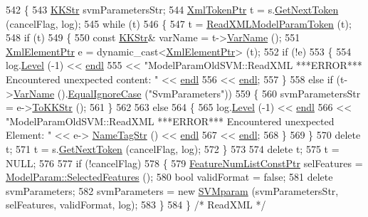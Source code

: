 \begin{DoxyCode}
542 \{
543   \hyperlink{class_k_k_b_1_1_k_k_str}{KKStr}  svmParametersStr;
544   \hyperlink{class_k_k_b_1_1_xml_token}{XmlTokenPtr}  t = s.\hyperlink{class_k_k_b_1_1_xml_stream_a87cc738b05c666cf5d5c25beaab477b4}{GetNextToken} (cancelFlag, log);
545   \textcolor{keywordflow}{while}  (t)
546   \{
547     t = \hyperlink{class_k_k_m_l_l_1_1_model_param_a6d51128c4b26cb4c432091dc2e21415d}{ReadXMLModelParamToken} (t);
548     \textcolor{keywordflow}{if}  (t)
549     \{
550       \textcolor{keyword}{const} \hyperlink{class_k_k_b_1_1_k_k_str}{KKStr}& varName = t->\hyperlink{class_k_k_b_1_1_xml_token_a28b39cfdfa2ed63048a812b1cb52263c}{VarName} ();
551       \hyperlink{class_k_k_b_1_1_xml_element}{XmlElementPtr} e = \textcolor{keyword}{dynamic\_cast<}\hyperlink{class_k_k_b_1_1_xml_element}{XmlElementPtr}\textcolor{keyword}{>} (t);
552       \textcolor{keywordflow}{if}  (!e)
553       \{
554         log.\hyperlink{class_k_k_b_1_1_run_log_a32cf761d7f2e747465fd80533fdbb659}{Level} (-1) << \hyperlink{namespace_k_k_b_ad1f50f65af6adc8fa9e6f62d007818a8}{endl}
555           << \textcolor{stringliteral}{"ModelParamOldSVM::ReadXML   ***ERROR***   Encountered unexpected content: "} << 
      \hyperlink{namespace_k_k_b_ad1f50f65af6adc8fa9e6f62d007818a8}{endl}
556           << \hyperlink{namespace_k_k_b_ad1f50f65af6adc8fa9e6f62d007818a8}{endl};
557       \}
558       \textcolor{keywordflow}{else} \textcolor{keywordflow}{if}  (t->\hyperlink{class_k_k_b_1_1_xml_token_a28b39cfdfa2ed63048a812b1cb52263c}{VarName} ().\hyperlink{class_k_k_b_1_1_k_k_str_a562f9696417c53f66bc4088eac072ab5}{EqualIgnoreCase} (\textcolor{stringliteral}{"SvmParameters"}))
559       \{
560         svmParametersStr = e->\hyperlink{class_k_k_b_1_1_xml_element_a3028fc03b79509e6378749f6a8b426b9}{ToKKStr} ();
561       \}
562 
563       \textcolor{keywordflow}{else}
564       \{
565         log.\hyperlink{class_k_k_b_1_1_run_log_a32cf761d7f2e747465fd80533fdbb659}{Level} (-1) << \hyperlink{namespace_k_k_b_ad1f50f65af6adc8fa9e6f62d007818a8}{endl}
566           << \textcolor{stringliteral}{"ModelParamOldSVM::ReadXML   ***ERROR***   Encountered unexpected Element: "} << e->
      \hyperlink{class_k_k_b_1_1_xml_element_a86a0fcbb58e998149503b7735690cd7b}{NameTagStr} () << \hyperlink{namespace_k_k_b_ad1f50f65af6adc8fa9e6f62d007818a8}{endl}
567           << \hyperlink{namespace_k_k_b_ad1f50f65af6adc8fa9e6f62d007818a8}{endl};
568       \}
569     \}
570     \textcolor{keyword}{delete}  t;
571     t = s.\hyperlink{class_k_k_b_1_1_xml_stream_a87cc738b05c666cf5d5c25beaab477b4}{GetNextToken} (cancelFlag, log);
572   \}
573 
574   \textcolor{keyword}{delete} t;
575   t = NULL;
576 
577   \textcolor{keywordflow}{if}  (!cancelFlag)
578   \{
579     \hyperlink{namespace_k_k_m_l_l_a81284b0a14973267260023f9a72da94a}{FeatureNumListConstPtr}  selFeatures = 
      \hyperlink{class_k_k_m_l_l_1_1_model_param_a99ae86303829d99bd252ccf4c4e672f8}{ModelParam::SelectedFeatures} ();
580     \textcolor{keywordtype}{bool}  validFormat = \textcolor{keyword}{false};
581     \textcolor{keyword}{delete}  svmParameters;
582     svmParameters = \textcolor{keyword}{new} \hyperlink{class_k_k_m_l_l_1_1_s_v_mparam}{SVMparam}  (svmParametersStr, selFeatures, validFormat, log);
583   \}
584 \}  \textcolor{comment}{/* ReadXML */}
\end{DoxyCode}
